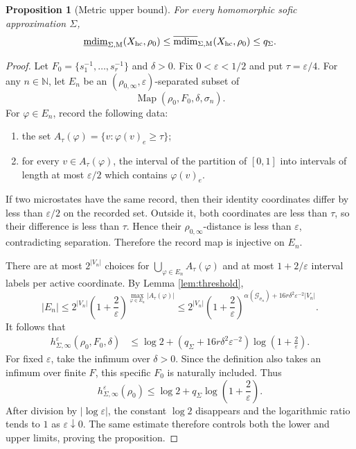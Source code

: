 \documentclass[12pt,a4paper]{amsart}
\newtheorem{proposition}[theorem]{Proposition}
\theoremstyle{definition}
\newcommand{\mdim}{\operatorname{mdim}}
\newcommand{\Map}{\operatorname{Map}}
\newcommand{\ind}{\alpha}
\newcommand{\cG}{\mathcal G}
\begin{document}
	\begin{proposition}[Metric upper bound]\label{prop:metric-upper}
		For every homomorphic sofic approximation $\Sigma$,
		\[
		\underline{\mdim}_{\Sigma,\mathrm M}(X_{\rm hc},\rho_0)\le 
		\overline{\mdim}_{\Sigma,\mathrm M}(X_{\rm hc},\rho_0)\le q_\Sigma.
		\]
	\end{proposition}
	
	\begin{proof}
     Let $F_0=\{s_1^{-1},\ldots,s_r^{-1}\}$  and $\delta>0$.
		Fix $0<\varepsilon<1/2$ and put $\tau=\varepsilon/4$.  For any $n\in\mathbb{N}$, let $E_n$ be an $(\rho_{0,\infty},\varepsilon)$-separated subset of
		\[
		\Map(\rho_0,F_0,\delta,\sigma_n).
		\]
		 For $\varphi\in E_n$, record the following data:
		\begin{enumerate}[label=\textup{(\roman*)}]
			\item the set $A_\tau(\varphi)=\{v:\varphi(v)_e\ge\tau\}$;
			\item for every $v\in A_\tau(\varphi)$, the interval of the partition of $[0,1]$ into intervals of length at most $\varepsilon/2$ which contains $\varphi(v)_e$.
		\end{enumerate}
		If two microstates have the same record, then their identity coordinates differ by less than $\varepsilon/2$ on the recorded set.  Outside it, both coordinates are less than $\tau$, so their difference is less than $\tau$.  Hence their $\rho_{0,\infty}$-distance is less than $\varepsilon$, contradicting separation.  Therefore the record map is injective on $E_n$.
		
		There are at most $2^{|V_n|}$ choices for $\bigcup_{\varphi \in E_n}A_{\tau}(\varphi)$ and at most $1+2/\varepsilon$ interval labels per active coordinate.  By Lemma \ref{lem:threshold},
		\[
		|E_n| \le 2^{|V_n|}
		\left(1+\frac2\varepsilon\right)^{
			\max_{\varphi \in E_n}|A_{\tau}(\varphi)|}
		\le 2^{|V_n|}
		\left(1+\frac2\varepsilon\right)^{
			\ind(\cG_{\sigma_n})+16r\delta^2\varepsilon^{-2}|V_n|}.
		\]
		It follows that
		\begin{align*}
			h^\varepsilon_{\Sigma,\infty}(\rho_0,F_0,\delta)
			&\le \log2+\left(q_\Sigma+16r\delta^2\varepsilon^{-2}\right)
			\log\left(1+\frac2\varepsilon\right).
		\end{align*}
		For fixed $\varepsilon$, take the infimum over $\delta>0$.  Since the definition also takes an infimum over finite $F$, this specific $F_0$ is naturally included.  Thus
		\[
		h^\varepsilon_{\Sigma,\infty}(\rho_0)
		\le \log2+q_\Sigma\log\left(1+\frac2\varepsilon\right).
		\]
		After division by $|\log\varepsilon|$, the constant $\log2$ disappears and the logarithmic ratio tends to $1$ as $\varepsilon\downarrow0$.  The same estimate therefore controls both the lower and upper limits, proving the proposition.
	\end{proof}
	
\end{document}
